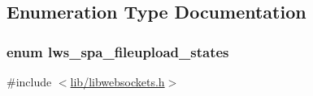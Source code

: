 \subsection{Enumeration Type Documentation}
\subsubsection[{\texorpdfstring{lws\+\_\+spa\+\_\+fileupload\+\_\+states}{lws\_spa\_fileupload\_states}}]{\setlength{\rightskip}{0pt plus 5cm}enum {\bf lws\+\_\+spa\+\_\+fileupload\+\_\+states}}\hypertarget{group__form-parsing_ga41a74a822771d3dce89751aa3bce28ae}{}\label{group__form-parsing_ga41a74a822771d3dce89751aa3bce28ae}


{\ttfamily \#include $<$\hyperlink{libwebsockets_8h}{lib/libwebsockets.\+h}$>$}

